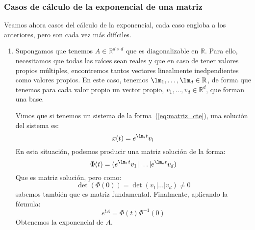 \subsubsection{Casos de cálculo de la exponencial de una matriz}
Veamos ahora casos del cálculo de la exponencial, cada caso engloba a los anteriores, pero son cada vez más difíciles.
\begin{enumerate}
    \item Supongamos que tenemos $A\in \mathbb{R}^{d\times d}$ que es diagonalizable en $\mathbb{R}$. Para ello, necesitamos que todas las raíces sean reales y que en caso de tener valores propios múltiples, encontremos tantos vectores linealmente inedpendientes como valores propios. En este caso, tenemos $\lm_1,\ldots,\lm_d\in \mathbb{R}$, de forma que tenemos para cada valor propio un vector propio, $v_1,\ldots,v_d\in \mathbb{R}^d$, que forman una base.

        Vimos que si tenemos un sistema de la forma~(\ref{eq:matriz_cte}), una solución del sistema es:
        \begin{equation*}
            x(t) = e^{\lm_i t}v_i
        \end{equation*}
        En esta situación, podemos producir una matriz solución de la forma:
        \begin{equation*}
            \Phi(t) = (e^{\lm_1t}v_1|\ldots|e^{\lm_d t}v_d)
        \end{equation*}
        Que es matriz solución, pero como:
        \begin{equation*}
            \det(\Phi(0)) = \det(v_1|\ldots|v_d) \neq 0
        \end{equation*}
        sabemos también que es matriz fundamental. Finalmente, aplicando la fórmula:
        \begin{equation*}
            e^{tA} = \Phi(t) \Phi^{-1}(0)
        \end{equation*}
        Obtenemos la exponencial de $A$.


\end{enumerate}
